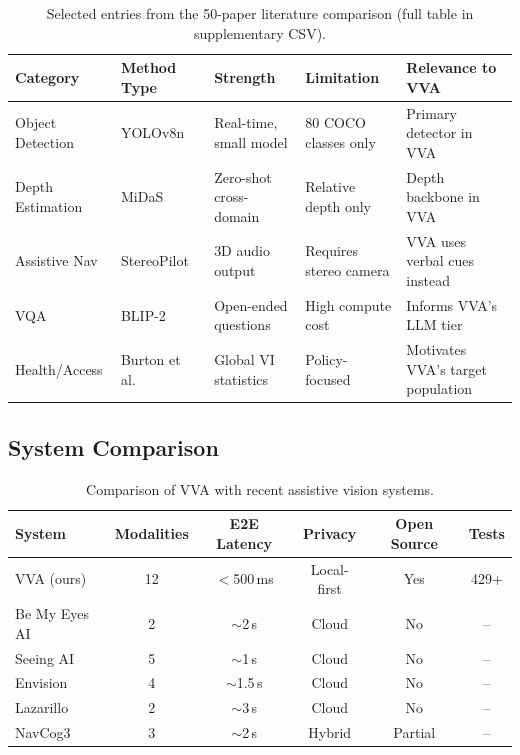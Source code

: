 \begin{table}[ht]
\centering
\caption{Selected entries from the 50-paper literature comparison (full table in supplementary CSV).}
\label{tab:literature}
\small
\begin{tabular}{p{3.5cm}p{2.5cm}p{3cm}p{3cm}p{3cm}}
\hline
\textbf{Category} & \textbf{Method Type} & \textbf{Strength} & \textbf{Limitation} & \textbf{Relevance to VVA} \\
\hline
Object Detection & YOLOv8n~\cite{jocher2023yolov8} & Real-time, small model & 80 COCO classes only & Primary detector in VVA \\
Depth Estimation & MiDaS~\cite{ranftl2020midas} & Zero-shot cross-domain & Relative depth only & Depth backbone in VVA \\
Assistive Nav & StereoPilot~\cite{stereopilot_wearable2023} & 3D audio output & Requires stereo camera & VVA uses verbal cues instead \\
VQA & BLIP-2~\cite{li2023blip2} & Open-ended questions & High compute cost & Informs VVA's LLM tier \\
Health/Access & Burton et al.~\cite{fpubh2022_visual_impairment} & Global VI statistics & Policy-focused & Motivates VVA's target population \\
\hline
\end{tabular}
\end{table}

\subsection{System Comparison}

\begin{table}[ht]
\centering
\caption{Comparison of VVA with recent assistive vision systems.}
\label{tab:system_comparison}
\begin{tabular}{p{2.5cm}ccccc}
\hline
\textbf{System} & \textbf{Modalities} & \textbf{E2E Latency} & \textbf{Privacy} & \textbf{Open Source} & \textbf{Tests} \\
\hline
VVA (ours) & 12 & $<$500\,ms & Local-first & Yes & 429+ \\
Be My Eyes AI & 2 & $\sim$2\,s & Cloud & No & -- \\
Seeing AI & 5 & $\sim$1\,s & Cloud & No & -- \\
Envision & 4 & $\sim$1.5\,s & Cloud & No & -- \\
Lazarillo & 2 & $\sim$3\,s & Cloud & No & -- \\
NavCog3 & 3 & $\sim$2\,s & Hybrid & Partial & -- \\
\hline
\end{tabular}
\end{table}
